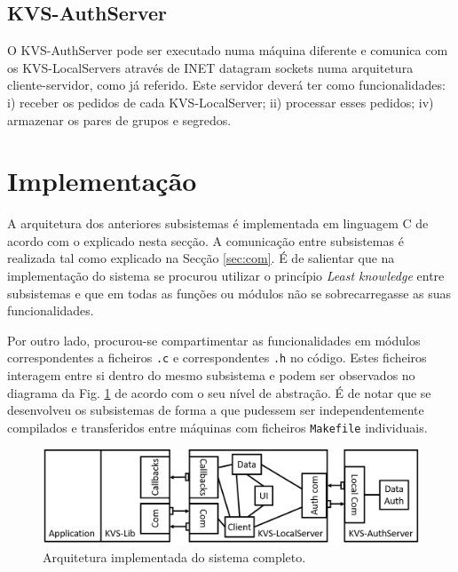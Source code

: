 \subsection{KVS-AuthServer} \label{sec:arch_auth}

O KVS-AuthServer pode ser executado numa máquina diferente e comunica com os KVS-LocalServers através de INET datagram sockets numa arquitetura cliente-servidor, como já referido. Este servidor deverá ter como funcionalidades: i) receber os pedidos de cada KVS-LocalServer; ii) processar esses pedidos; iv) armazenar os pares de grupos e segredos.

\section{Implementação}


A arquitetura dos anteriores subsistemas é implementada em linguagem C de acordo com o explicado nesta secção. A comunicação entre subsistemas é realizada tal como explicado na Secção \ref{sec:com}. É de salientar que na implementação do sistema se procurou utilizar o princípio \textit{Least knowledge} entre subsistemas e que em todas as funções ou módulos não se sobrecarregasse as suas funcionalidades.

Por outro lado, procurou-se compartimentar as funcionalidades em módulos correspondentes a ficheiros \texttt{.c} e correspondentes \texttt{.h} no código. Estes ficheiros interagem entre si dentro do mesmo subsistema e podem ser observados no diagrama da Fig. \ref{fig:architecture_detail} de acordo com o seu nível de abstração. É de notar que se desenvolveu os subsistemas de forma a que pudessem ser independentemente compilados e transferidos entre máquinas com ficheiros \texttt{Makefile} individuais.

\begin{figure}[ht!]
    \centering
    \includegraphics[width=0.7\linewidth]{figures/architecture_detail.png}
    \caption{Arquitetura implementada do sistema completo.}
    \label{fig:architecture_detail}
\end{figure}

